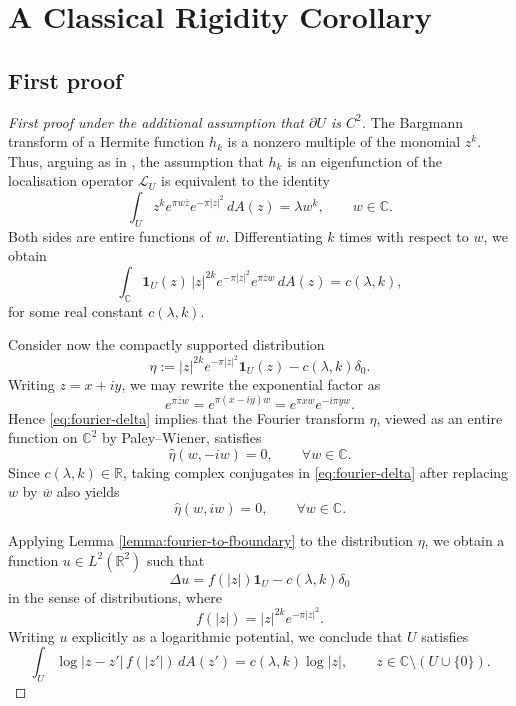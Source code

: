 \documentclass[a4paper,11pt,reqno]{amsart}
\numberwithin{equation}{section}
\theoremstyle{plain} %
\theoremstyle{definition} %
\theoremstyle{remark}
\newcommand{\R}{\mathbb{R}}
\newcommand{\C}{\mathbb{C}}
\begin{document}
\section{A Classical Rigidity Corollary}\label{sec:classical-rigidity}

\subsection{First proof}

\begin{proof}[First proof under the additional assumption that \(\partial U\) is \(C^2\)]
The Bargmann transform of a Hermite function $h_k$ is a nonzero multiple of the monomial $z^k$. Thus, arguing as in \cite{Abreu-Doerfler}, the assumption that $h_k$ is an eigenfunction of the localisation operator $\mathcal{L}_U$ is equivalent to the identity
\[
\int_U z^k e^{\pi w\overline{z}} e^{-\pi |z|^2}\,dA(z)=\lambda w^k,
\qquad w\in \C.
\]
Both sides are entire functions of $w$. Differentiating $k$ times with respect to $w$, we obtain
\begin{equation}\label{eq:fourier-delta}
\int_{\C} \mathbf{1}_U(z)\,|z|^{2k}e^{-\pi |z|^2} e^{\pi \overline{z} w}\,dA(z)=c(\lambda,k),
\end{equation}
for some real constant $c(\lambda,k)$.

Consider now the compactly supported distribution
\[
\eta:=|z|^{2k}e^{-\pi |z|^2}\mathbf{1}_U(z)-c(\lambda,k)\delta_0.
\]
Writing $z=x+iy$, we may rewrite the exponential factor as
\[
e^{\pi \overline{z}w}=e^{\pi(x-iy)w}=e^{\pi xw}e^{-i\pi yw}.
\]
Hence \eqref{eq:fourier-delta} implies that the Fourier transform $\widehat{\eta}$, viewed as an entire function on $\C^2$ by Paley--Wiener, satisfies
\[
\widehat{\eta}(w,-iw)=0,\qquad \forall w\in\C.
\]
Since $c(\lambda,k)\in \R$, taking complex conjugates in \eqref{eq:fourier-delta} after replacing $w$ by $\overline{w}$ also yields
\[
\widehat{\eta}(w,iw)=0,\qquad \forall w\in\C.
\]

Applying Lemma \ref{lemma:fourier-to-fboundary} to the distribution $\eta$, we obtain a function $u\in L^2(\R^2)$ such that
\begin{equation}\label{eq:potato}
\Delta u=f(|z|)\mathbf{1}_U-c(\lambda,k)\delta_0
\end{equation}
in the sense of distributions, where
\[
f(|z|)=|z|^{2k}e^{-\pi |z|^2}.
\]
Writing $u$ explicitly as a logarithmic potential, we conclude that $U$ satisfies
\begin{equation}\label{eq:potential}
\int_U \log|z-z'|\,f(|z'|)\,dA(z')=c(\lambda,k)\log|z|,
\qquad z\in \C\setminus (U\cup\{0\}).
\end{equation}


\end{proof}
\end{document}

